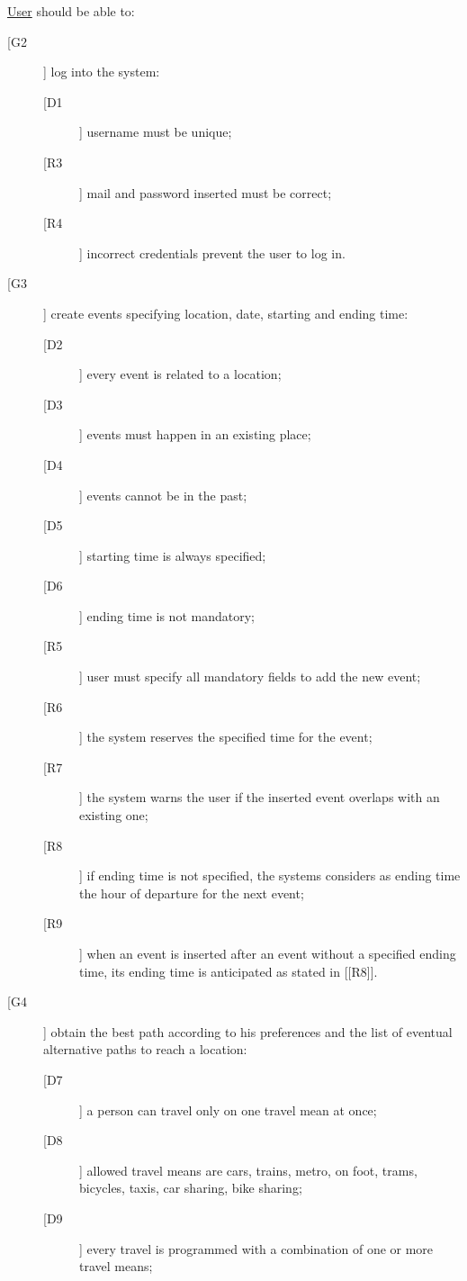 \noindent\underline{User} should be able to:
\begin{description}
\item[[G2]] log into the system:
	\begin{description}
	\item[[D1]] username must be unique;
	\newline
	\item[[R3]] mail and password inserted must be correct;
	\item[[R4]] incorrect credentials prevent the user to log in.
	\end{description}
\item[[G3]] create events specifying location, date, starting and ending time:
	\begin{description}
	\item[[D2]] every event is related to a location;
	\item[[D3]] events must happen in an existing place;
	\item[[D4]] events cannot be in the past;
	\item[[D5]] starting time is always specified;
	\item[[D6]] ending time is not mandatory;
	\newline
	\item[[R5]] user must specify all mandatory fields to add the new event;
	\item[[R6]] the system reserves the specified time for the event;
	\item[[R7]] the system warns the user if the inserted event overlaps with an existing one;
	\item[[R8]] if ending time is not specified, the systems considers as ending time the hour of departure for the next event;
	\item[[R9]] when an event is inserted after an event without a specified ending time, its ending time is anticipated as stated in [[R8]].
	\end{description}
\item[[G4]] obtain the best path according to his preferences and the list of eventual alternative paths to reach a location:
	\begin{description}
	\item[[D7]] a person can travel only on one travel mean at once; 
	\item[[D8]] allowed travel means are cars, trains, metro, on foot, trams, bicycles, taxis, car sharing, bike sharing;
	\item[[D9]] every travel is programmed with a combination of one or more travel means;

\end{description}
\end{description}
